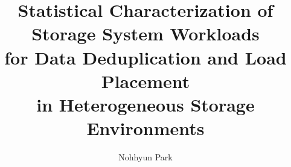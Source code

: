 \phd %

\title{\bf Statistical Characterization of Storage System Workloads
\\
for Data Deduplication and Load Placement 
\\
in Heterogeneous Storage Environments}
\author{Nohhyun Park}


\abstract{}
\acknowledgements{}
\dedication{}
%

\beforepreface 

\figurespage
\tablespage

\afterpreface            
